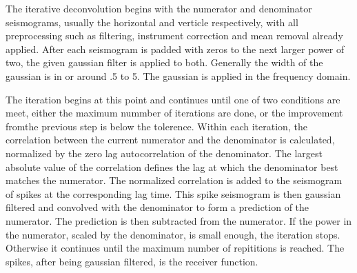 \documentclass[titlepage]{article}
\begin{document}
The iterative deconvolution begins with the numerator and denominator seismograms, usually the horizontal and verticle respectively, with all preprocessing such as filtering, instrument correction and mean removal already applied. After each seismogram is padded with zeros to the next larger power of two, the given gaussian filter is applied to both. Generally the width of the gaussian is in or around .5 to 5. The gaussian is applied in the frequency domain.

The iteration begins at this point and continues until one of two conditions are meet, either the maximum nummber of iterations are done, or the improvement fromthe previous step is below the tolerence. Within each iteration, the correlation between the current numerator and the denominator is calculated, normalized by the zero lag autocorrelation of the denominator. The largest absolute value of the correlation defines the lag at which the denominator best matches the numerator. The normalized correlation is added to the seismogram of spikes at the corresponding lag time. This spike seismogram is then gaussian filtered and convolved with the denominator to form a prediction of the numerator. The prediction is then subtracted from the numerator. If the power in the numerator, scaled by the denominator, is small enough, the iteration stops. Otherwise it continues until the maximum number of repititions is reached. The spikes, after being gaussian filtered, is the receiver function.
\end{document}
